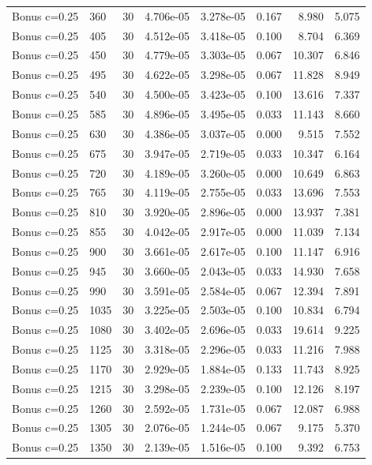 \begin{scriptsize}
\begin{longtable}{llrrrrrr}
Bonus c=0.25 & 360 & 30 & 4.706e-05 & 3.278e-05 & 0.167 & 8.980 & 5.075 \\
Bonus c=0.25 & 405 & 30 & 4.512e-05 & 3.418e-05 & 0.100 & 8.704 & 6.369 \\
Bonus c=0.25 & 450 & 30 & 4.779e-05 & 3.303e-05 & 0.067 & 10.307 & 6.846 \\
Bonus c=0.25 & 495 & 30 & 4.622e-05 & 3.298e-05 & 0.067 & 11.828 & 8.949 \\
Bonus c=0.25 & 540 & 30 & 4.500e-05 & 3.423e-05 & 0.100 & 13.616 & 7.337 \\
Bonus c=0.25 & 585 & 30 & 4.896e-05 & 3.495e-05 & 0.033 & 11.143 & 8.660 \\
Bonus c=0.25 & 630 & 30 & 4.386e-05 & 3.037e-05 & 0.000 & 9.515 & 7.552 \\
Bonus c=0.25 & 675 & 30 & 3.947e-05 & 2.719e-05 & 0.033 & 10.347 & 6.164 \\
Bonus c=0.25 & 720 & 30 & 4.189e-05 & 3.260e-05 & 0.000 & 10.649 & 6.863 \\
Bonus c=0.25 & 765 & 30 & 4.119e-05 & 2.755e-05 & 0.033 & 13.696 & 7.553 \\
Bonus c=0.25 & 810 & 30 & 3.920e-05 & 2.896e-05 & 0.000 & 13.937 & 7.381 \\
Bonus c=0.25 & 855 & 30 & 4.042e-05 & 2.917e-05 & 0.000 & 11.039 & 7.134 \\
Bonus c=0.25 & 900 & 30 & 3.661e-05 & 2.617e-05 & 0.100 & 11.147 & 6.916 \\
Bonus c=0.25 & 945 & 30 & 3.660e-05 & 2.043e-05 & 0.033 & 14.930 & 7.658 \\
Bonus c=0.25 & 990 & 30 & 3.591e-05 & 2.584e-05 & 0.067 & 12.394 & 7.891 \\
Bonus c=0.25 & 1035 & 30 & 3.225e-05 & 2.503e-05 & 0.100 & 10.834 & 6.794 \\
Bonus c=0.25 & 1080 & 30 & 3.402e-05 & 2.696e-05 & 0.033 & 19.614 & 9.225 \\
Bonus c=0.25 & 1125 & 30 & 3.318e-05 & 2.296e-05 & 0.033 & 11.216 & 7.988 \\
Bonus c=0.25 & 1170 & 30 & 2.929e-05 & 1.884e-05 & 0.133 & 11.743 & 8.925 \\
Bonus c=0.25 & 1215 & 30 & 3.298e-05 & 2.239e-05 & 0.100 & 12.126 & 8.197 \\
Bonus c=0.25 & 1260 & 30 & 2.592e-05 & 1.731e-05 & 0.067 & 12.087 & 6.988 \\
Bonus c=0.25 & 1305 & 30 & 2.076e-05 & 1.244e-05 & 0.067 & 9.175 & 5.370 \\
Bonus c=0.25 & 1350 & 30 & 2.139e-05 & 1.516e-05 & 0.100 & 9.392 & 6.753 \\

\end{longtable}
\end{scriptsize}
